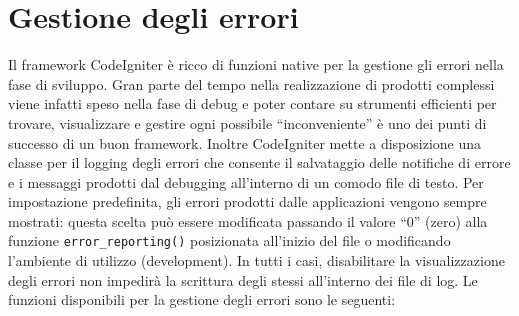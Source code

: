 \section*{Gestione degli errori}
Il framework CodeIgniter è ricco di funzioni native per la gestione gli errori nella fase di sviluppo. Gran parte del tempo nella realizzazione di prodotti complessi viene infatti speso nella fase di debug e poter contare su strumenti efficienti per trovare, visualizzare e gestire ogni possibile ``inconveniente'' è uno dei punti di successo di un buon framework. Inoltre CodeIgniter mette a disposizione una classe per il logging degli errori che consente il salvataggio delle notifiche di errore e i messaggi prodotti dal debugging all'interno di un comodo file di testo. Per impostazione predefinita, gli errori prodotti dalle applicazioni vengono sempre mostrati: questa scelta può essere modificata passando il valore ``0'' (zero) alla funzione \verb|error_reporting()| posizionata all'inizio del file  o modificando l'ambiente di utilizzo (development). In tutti i casi, disabilitare la visualizzazione degli errori non impedirà la scrittura degli stessi all'interno dei file di log. Le funzioni disponibili per la gestione degli errori sono le seguenti:

